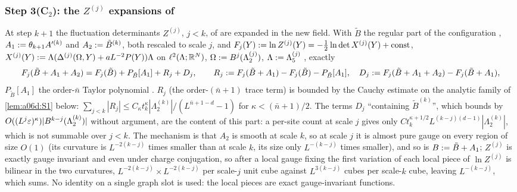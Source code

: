
\subsubsection*{Step 3(C$_2$): the $Z^{(j)}$ expansions of \cite[p.~578]{Ba2}}

At step $k+1$ the fluctuation determinants $Z^{(j)}$, $j<k$, of \cite[(2.92)]{Ba2} are expanded in the new field. With $\tilde B$ the regular part of the configuration \cite[(2.93)--(2.94)]{Ba2}, $A_1:=\theta_{k+1}A'^{(k)}$ and $A_2:=\tilde B^{(k)}$, both rescaled to scale $j$, and $F_j(Y):=\ln Z^{(j)}(Y)=-\frac12\ln\det X^{(j)}(Y)+\mathrm{const}$, $X^{(j)}(Y):=\Lambda(\Delta^{(j)}(\Omega,Y)+aL^{-2}P(Y))\Lambda$ on $\ell^2(\Lambda;\mathbb R^N)$, $\Omega:= B^j(\Lambda^{(j)}_2)$, $\Lambda:=\Lambda^{(j)}_5$ \cite[(2.92), (2.99)]{Ba2}, exactly
\[
F_j(\tilde B+A_1+A_2)=F_j(\tilde B)+P_{\tilde B}[A_1]+R_j+D_j,\qquad R_j:= F_j(\tilde B+A_1)-F_j(\tilde B)-P_{\tilde B}[A_1],\quad D_j:= F_j(\tilde B+A_1+A_2)-F_j(\tilde B+A_1),
\]
$P_{\tilde B}[A_1]$ the order-$\bar n$ Taylor polynomial \cite[(2.104)]{Ba2}. $R_j$ (the order-$(\bar n+1)$ trace term) is bounded by the Cauchy estimate on the analytic family of \cref{lem:a06d:S1} below: $\sum_{j<k}|R_j|\le C_{\kappa}t_k^\kappa|\Lambda^{(k)}_2|/(L^{\bar n+1-d}-1)$ for $\kappa<(\bar n+1)/2$. The terms $D_j$ ``containing $\tilde B^{(k)}$'', which \cite[p.~578]{Ba2} bounds by $O((L^j\varepsilon)^\kappa)|B^{k-j}(\Lambda^{(k)}_2)|$ without argument, are the content of this part: a per-site count at scale $j$ gives only $Ct_k^{\kappa+1/2}L^{(k-j)(d-1)}|\Lambda^{(k)}_2|$, which is not summable over $j<k$. The mechanism is that $A_2$ is smooth at scale $k$, so at scale $j$ it is almost pure gauge on every region of size $O(1)$ (its curvature is $L^{-2(k-j)}$ times smaller than at scale $k$, its size only $L^{-(k-j)}$ times smaller), and so is $B:=\tilde B+A_1$; $Z^{(j)}$ is exactly gauge invariant and even under charge conjugation, so after a local gauge fixing the first variation of each local piece of $\ln Z^{(j)}$ is bilinear in the two curvatures, $L^{-2(k-j)}\times L^{-2(k-j)}$ per scale-$j$ unit cube against $L^{3(k-j)}$ cubes per scale-$k$ cube, leaving $L^{-(k-j)}$, which sums. No identity on a single graph slot is used: the local pieces are exact gauge-invariant functions.

